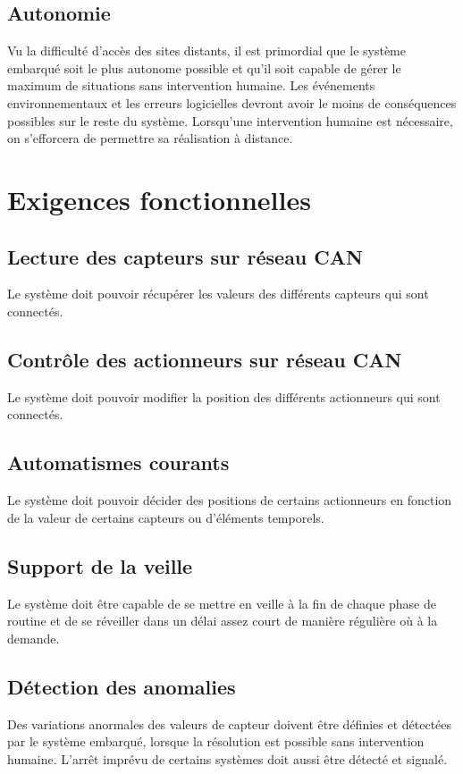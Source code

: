 \documentclass[a4paper, 11pt, final]{article}
\begin{document}
\subsection{Autonomie}

Vu la difficulté d'accès des sites distants, il est primordial que le système embarqué soit le plus autonome possible et qu'il soit capable de gérer le maximum de situations sans intervention humaine. Les événements environnementaux et les erreurs logicielles devront avoir le moins de conséquences possibles sur le reste du système. Lorsqu'une intervention humaine est nécessaire, on s'efforcera de permettre sa réalisation à distance.



\section{Exigences fonctionnelles}

\subsection{Lecture des capteurs sur réseau CAN}
Le système doit pouvoir récupérer les valeurs des différents capteurs qui sont connectés.
\subsection{Contrôle des actionneurs sur réseau CAN}
Le système doit pouvoir modifier la position des différents actionneurs qui sont connectés.
\subsection{Automatismes courants}
Le système doit pouvoir décider des positions de certains actionneurs en fonction de la valeur de certains capteurs ou d'éléments temporels.
\subsection{Support de la veille}
Le système doit être capable de se mettre en veille à la fin de chaque phase de routine et de se réveiller dans un délai assez court de manière régulière où à la demande.


\subsection{Détection des anomalies}
Des variations anormales des valeurs de capteur doivent être définies et détectées par le système embarqué, lorsque la résolution est possible sans intervention humaine. L'arrêt imprévu de certains systèmes doit aussi être détecté et signalé.
\end{document}
